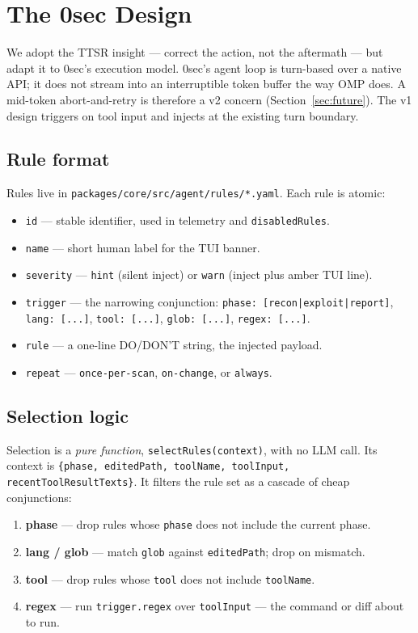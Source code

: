 \documentclass[11pt]{article}
\begin{document}
\section{The 0sec Design}
\label{sec:design}

We adopt the TTSR insight --- correct the action, not the aftermath --- but
adapt it to 0sec's execution model. 0sec's agent loop is turn-based over a native
API; it does not stream into an interruptible token buffer the way OMP does.
A mid-token abort-and-retry is therefore a v2 concern (Section~\ref{sec:future}).
The v1 design triggers on tool input and injects at the existing turn boundary.

\subsection{Rule format}

Rules live in \texttt{packages/core/src/agent/rules/*.yaml}. Each rule is atomic:

\begin{itemize}[leftmargin=*,itemsep=1pt]
  \item \texttt{id} --- stable identifier, used in telemetry and \texttt{disabledRules}.
  \item \texttt{name} --- short human label for the TUI banner.
  \item \texttt{severity} --- \texttt{hint} (silent inject) or \texttt{warn} (inject plus amber TUI line).
  \item \texttt{trigger} --- the narrowing conjunction: \texttt{phase: [recon|exploit|report]}, \texttt{lang: [...]}, \texttt{tool: [...]}, \texttt{glob: [...]}, \texttt{regex: [...]}.
  \item \texttt{rule} --- a one-line DO/DON'T string, the injected payload.
  \item \texttt{repeat} --- \texttt{once-per-scan}, \texttt{on-change}, or \texttt{always}.
\end{itemize}

\subsection{Selection logic}

Selection is a \emph{pure function}, \texttt{selectRules(context)}, with no LLM
call. Its context is
\texttt{\{phase, editedPath, toolName, toolInput, recentToolResultTexts\}}. It
filters the rule set as a cascade of cheap conjunctions:

\begin{enumerate}[leftmargin=*,itemsep=1pt]
  \item \textbf{phase} --- drop rules whose \texttt{phase} does not include the current phase.
  \item \textbf{lang / glob} --- match \texttt{glob} against \texttt{editedPath}; drop on mismatch.
  \item \textbf{tool} --- drop rules whose \texttt{tool} does not include \texttt{toolName}.
  \item \textbf{regex} --- run \texttt{trigger.regex} over \texttt{toolInput} --- the command or diff about to run.
\end{enumerate}
\end{document}

